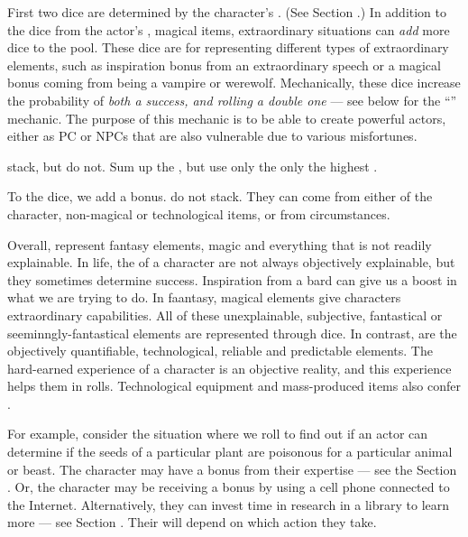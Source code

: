First two dice are determined by the character's .
(See Section .)
In addition to the dice from the actor's ,
magical items, extraordinary situations can \emph{add} more dice to the pool.
These dice are for representing different types of extraordinary elements, such
as inspiration bonus from an extraordinary speech or a magical bonus coming
from being a vampire or werewolf. Mechanically, these dice increase the
probability of \emph{both a success, and rolling a double one} ---
see  below for the ``'' mechanic.
The purpose of this mechanic is to be able to create powerful actors,
either as PC or NPCs that are also vulnerable due to various misfortunes.

\begin{emphasisParagraph}
	 stack, but  do not.
	Sum up the , but use only the only the highest .
\end{emphasisParagraph}


To the dice, we add a bonus.  do not stack.
They can come from either  of the character,
non-magical or technological items, or from circumstances.

Overall,  represent fantasy elements, magic and everything that is not readily explainable.
In life, the  of a character are not always objectively explainable, but they sometimes determine success.
Inspiration from a bard can give us a boost in what we are trying to do.
In faantasy, magical elements give characters extraordinary capabilities.
All of these unexplainable, subjective, fantastical or seeminngly-fantastical elements are represented through dice.
In contrast,  are the objectively quantifiable, technological, reliable and predictable elements.
The hard-earned experience of a character is an objective reality, and this experience helps them in rolls.
Technological equipment and mass-produced items also confer .


For example, consider the situation where we roll to find out if
an actor can determine if the seeds of a particular plant are
poisonous for a particular animal or beast. The character may have a
bonus from their expertise --- see the Section .
Or, the character may be receiving a bonus by using a cell phone connected to the Internet.
Alternatively, they can invest time in research in a library to learn more
--- see Section .
Their  will depend on which action they take.


